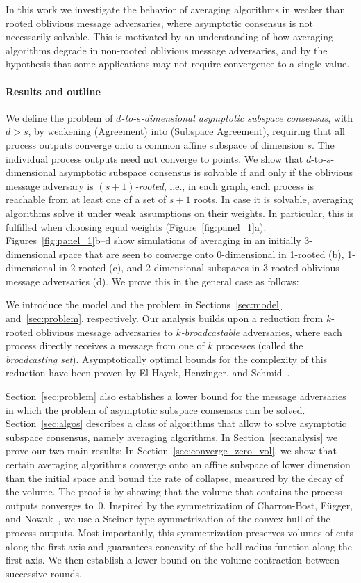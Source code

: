 \documentclass[preprint,12pt,a4paper]{elsarticle}
\theoremstyle{plain}
\theoremstyle{definition}
\begin{document}
In this work we investigate the behavior of averaging algorithms in weaker than
  rooted oblivious message adversaries, where asymptotic consensus is not necessarily solvable.
This is motivated by an understanding of how averaging algorithms degrade in
  non-rooted oblivious message adversaries, and by the hypothesis that some applications
  may not require convergence to a single value.


\paragraph*{Results and outline}

We define the problem of \emph{$d$-to-$s$-dimensional asymptotic subspace consensus}, with $d > s$, by weakening
(Agreement) into (Subspace Agreement), requiring that all process outputs converge onto a common affine subspace of dimension $s$.
The individual process outputs need not converge to points.
We show that $d$-to-$s$-dimensional asymptotic subspace consensus is solvable if and only if the oblivious message adversary is \emph{$(s+1)$-rooted}, i.e., in each graph, each process is reachable from at least one of a set of $s+1$ roots.
In case it is solvable, averaging algorithms solve it under weak assumptions on their weights.
In particular, this is fulfilled when choosing equal weights (Figure~\ref{fig:panel_1}a).
Figures~\ref{fig:panel_1}b--d show simulations of averaging in an initially 3-dimensional space that are seen to converge onto 0-dimensional in 1-rooted (b), 1-dimensional in 2-rooted (c), and 2-dimensional subspaces in 3-rooted oblivious message adversaries (d).
We prove this in the general case as follows:

We introduce the model and the problem in Sections~\ref{sec:model} and~\ref{sec:problem}, respectively.
Our analysis builds upon a reduction from $k$-rooted oblivious message adversaries to \emph{$k$-broadcastable} adversaries, where each process directly receives a message from one of $k$ processes (called the \emph{broadcasting set}).
Asymptotically optimal bounds for the complexity of this reduction have been proven by El-Hayek, Henzinger, and Schmid~\cite{el2023asymptotically}.

Section~\ref{sec:problem} also establishes a lower bound for the message adversaries in which the problem of asymptotic subspace consensus can be solved.
Section~\ref{sec:algos} describes a class of algorithms that allow to solve asymptotic subspace consensus, namely averaging algorithms.
In Section~\ref{sec:analysis} we prove our two main results:
In Section~\ref{sec:converge_zero_vol}, we show that certain averaging algorithms converge onto an affine subspace of lower dimension than the initial space and bound the rate of collapse, measured by the decay of the volume.
The proof is by showing that the volume that contains the process outputs converges to~0.
Inspired by the symmetrization of Charron-Bost, Függer, and Nowak~\cite{CBFN16:centroid}, we use a Steiner-type symmetrization of the convex hull of the process outputs.
Most importantly, this symmetrization preserves volumes of cuts along the first axis and guarantees concavity of the ball-radius function along the first axis.
We then establish a lower bound on the volume contraction between successive rounds.
\end{document}
